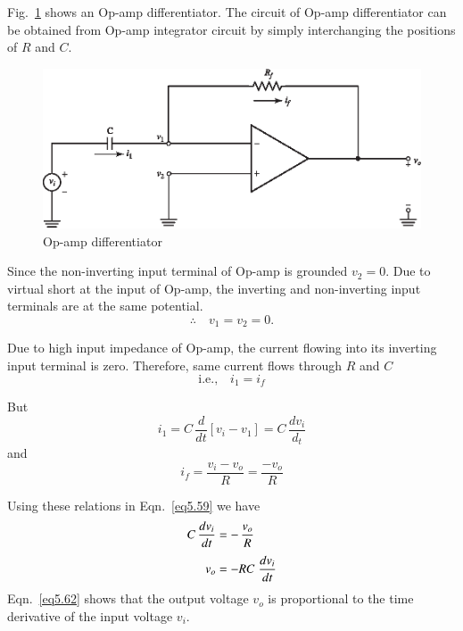 Fig.~\ref{fig5.20} shows an Op-amp differentiator. The circuit of Op-amp differentiator can be obtained from Op-amp integrator circuit by simply interchanging the positions of $R$ and $C$.
\begin{figure}[H]
\centering
\includegraphics{chap4/S3-EE-06-028.eps}
\caption{Op-amp differentiator}\label{fig5.20}
\end{figure}

Since the non-inverting input terminal of Op-amp is grounded $v_{2}=0$. Due to virtual short at the input of Op-amp, the inverting and non-inverting input terminals are at the same potential.
$$
\therefore\quad v_{1}=v_{2}=0.
$$

Due to high input impedance of Op-amp, the current flowing into its inverting input terminal is zero. Therefore, same current flows through $R$ and $C$
\begin{equation}
\text{i.e.,}\quad i_{1}=i_{f}\label{eq5.59}
\end{equation}

But
\begin{equation}
i_{1}=C\,\frac{d}{dt}[v_{i}-v_{1}]=C\,\frac{dv_{i}}{d_{t}}\label{eq5.60}
\end{equation}
and
\begin{equation}
i_{f}=\frac{v_{i}-v_{o}}{R}=\frac{-v_{o}}{R}\label{eq5.61}
\end{equation}

Using these relations in Eqn.~\eqref{eq5.59} we have
\begin{align}
C\,\dfrac{dv_{i}}{dt} &= -\,\frac{v_{o}}{R}\notag\\[3pt]
v_{o} &= -RC\;\frac{dv_{i}}{dt}\label{eq5.62}
\end{align}
Eqn.~\eqref{eq5.62} shows that the output voltage $v_{o}$ is proportional to the time derivative of the input voltage $v_{i}$.

